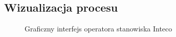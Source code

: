 \subsection{Wizualizacja procesu}
\label{lab:zad12}

\ifdefined\CompileImages
    \begin{figure}[H]      
        \caption{Graficzny interfejs operatora stanowiska Inteco}
    \end{figure}
\fi
\newpage

